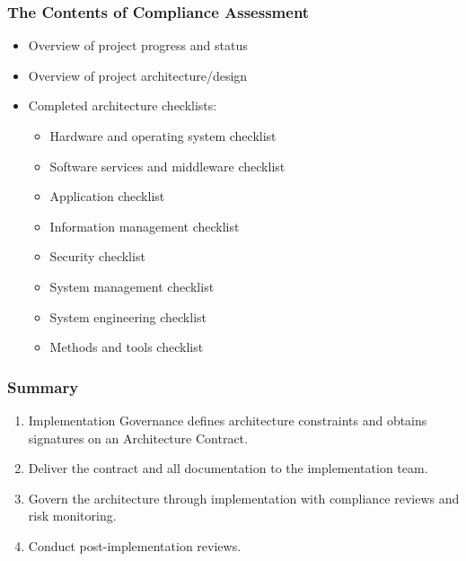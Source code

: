 \documentclass[aspectratio=169, table]{beamer}
\begin{document}
\begin{frame}
	\frametitle{The Contents of Compliance Assessment}
	
	\begin{itemize}
		\item Overview of project progress and status
		\item Overview of project architecture/design
		\item Completed architecture checklists:
		\begin{itemize}
			\item Hardware and operating system checklist
			\item Software services and middleware checklist
			\item Application checklist
			\item Information management checklist
			\item Security checklist
			\item System management checklist
			\item System engineering checklist
			\item Methods and tools checklist
		\end{itemize}
	\end{itemize}
\end{frame}


	\begin{frame}
		\frametitle{Summary}
		\begin{enumerate}
			\item Implementation Governance defines architecture constraints and obtains signatures on an Architecture Contract.
			\item Deliver the contract and all documentation to the implementation team.
			\item Govern the architecture through implementation with compliance reviews and risk monitoring.
			\item Conduct post-implementation reviews.
		\end{enumerate}
		
	\end{frame}
	
\end{document}
